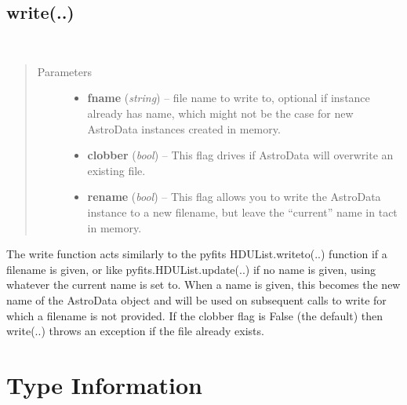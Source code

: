 \documentclass[letterpaper,10pt,english]{sphinxmanual}
\begin{document}
\subsection{write(..)}
\label{chapter_AstroDataClass:write}

\begin{fulllineitems}
\label{chapter_AstroDataClass:astrodata.data.AstroData.write}~\begin{quote}\begin{description}
\item[{Parameters}] \leavevmode\begin{itemize}
\item {} 
\textbf{fname} (\emph{string}) -- file name to write to, optional if instance already has
name, which might not be the case for new AstroData
instances created in memory.

\item {} 
\textbf{clobber} (\emph{bool}) -- This flag drives if AstroData will overwrite an existing
file.

\item {} 
\textbf{rename} (\emph{bool}) -- This flag allows you to write the AstroData instance to
a new filename, but leave the ``current'' name in tact in memory.

\end{itemize}

\end{description}\end{quote}

The write function acts similarly to the pyfits HDUList.writeto(..)
function if a filename is given, or like pyfits.HDUList.update(..) if 
no name is given, using whatever the current name is set to. When a name
is given, this becomes the new name of the AstroData object and
will be used on subsequent calls to  write for which a filename is not
provided. If the clobber flag is False (the default) then write(..)
throws an exception if the file already exists.

\end{fulllineitems}



\section{Type Information}
\label{chapter_AstroDataClass:type-information}
\end{document}
